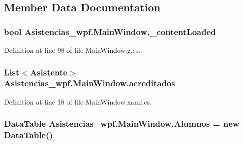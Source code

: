 \subsection{Member Data Documentation}
\hypertarget{class_asistencias__wpf_1_1_main_window_ae44c6b71b9c471b3dc9ab07e778e5781}{
\subsubsection[{\-\_\-content\-Loaded}]{\setlength{\rightskip}{0pt plus 5cm}bool Asistencias\-\_\-wpf.\-Main\-Window.\-\_\-content\-Loaded\hspace{0.3cm}{\ttfamily [private]}}}\label{class_asistencias__wpf_1_1_main_window_ae44c6b71b9c471b3dc9ab07e778e5781}


Definition at line 98 of file Main\-Window.\-g.\-cs.

\hypertarget{class_asistencias__wpf_1_1_main_window_a6bee34bf669bcc522d01affb6bfe1bae}{
\subsubsection[{acreditados}]{\setlength{\rightskip}{0pt plus 5cm}List$<${\bf Asistente}$>$ Asistencias\-\_\-wpf.\-Main\-Window.\-acreditados\hspace{0.3cm}{\ttfamily [private]}}}\label{class_asistencias__wpf_1_1_main_window_a6bee34bf669bcc522d01affb6bfe1bae}


Definition at line 18 of file Main\-Window.\-xaml.\-cs.

\hypertarget{class_asistencias__wpf_1_1_main_window_ac267271cbb547ec9c8b72482ff481894}{
\subsubsection[{Alumnos}]{\setlength{\rightskip}{0pt plus 5cm}Data\-Table Asistencias\-\_\-wpf.\-Main\-Window.\-Alumnos = new Data\-Table()\hspace{0.3cm}{\ttfamily [private]}}}\label{class_asistencias__wpf_1_1_main_window_ac267271cbb547ec9c8b72482ff481894}


